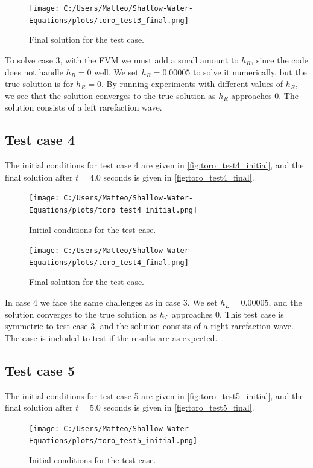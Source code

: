 \begin{figure}[H]
    \centering
    \texttt{[image: C:/Users/Matteo/Shallow-Water-Equations/plots/toro\_test3\_final.png]}
    \caption{Final solution for the test case.}\label{fig:toro_test3_final}
\end{figure}
To solve case 3, with the FVM we must add a small amount to $h_R$, since the code does not handle $h_R = 0$ well.
We set $h_R = 0.00005$ to solve it numerically, but the true solution is for $h_R = 0$.
By running experiments with different values of $h_R$, we see that the solution converges to the true solution as $h_R$ approaches 0.
The solution consists of a left rarefaction wave.

\subsection*{Test case 4}
The initial conditions for test case 4 are given in \autoref{fig:toro_test4_initial}, and the final solution after $t=4.0$ seconds is given in \autoref{fig:toro_test4_final}.
\begin{figure}[H]
    \centering
    \texttt{[image: C:/Users/Matteo/Shallow-Water-Equations/plots/toro\_test4\_initial.png]}
    \caption{Initial conditions for the test case.}\label{fig:toro_test4_initial}
\end{figure}

\begin{figure}[H]
    \centering
    \texttt{[image: C:/Users/Matteo/Shallow-Water-Equations/plots/toro\_test4\_final.png]}
    \caption{Final solution for the test case.}\label{fig:toro_test4_final}
\end{figure}
In case 4 we face the same challenges as in case 3.
We set $h_L = 0.00005$, and the solution converges to the true solution as $h_L$ approaches 0.
This test case is symmetric to test case 3, and the solution consists of a right rarefaction wave.
The case is included to test if the results are as expected.

\subsection*{Test case 5}
The initial conditions for test case 5 are given in \autoref{fig:toro_test5_initial}, and the final solution after $t=5.0$ seconds is given in \autoref{fig:toro_test5_final}.
\begin{figure}[H]
    \centering
    \texttt{[image: C:/Users/Matteo/Shallow-Water-Equations/plots/toro\_test5\_initial.png]}
    \caption{Initial conditions for the test case.}\label{fig:toro_test5_initial}
\end{figure}

